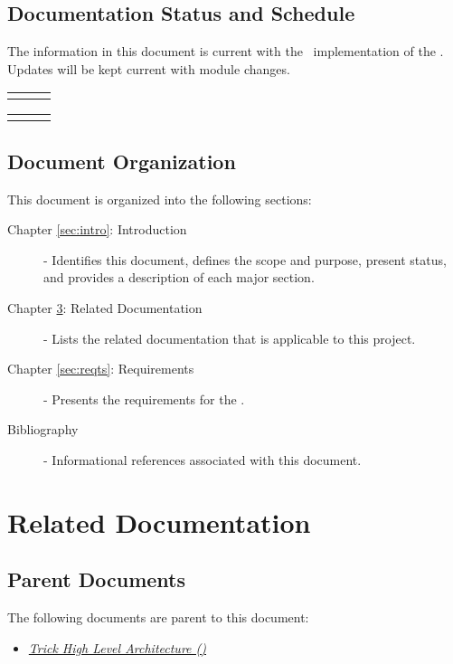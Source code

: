 \documentclass[twoside,11pt,titlepage]{report}
\begin{document}
\section{Documentation Status and Schedule}
The information in this document is current with the \TrickHLAid\
implementation of the \TrickHLA. Updates will be kept current with
module changes.

\begin{tabular}{||l|l|l|} \hline
\documentHistory
\end{tabular}

\begin{tabular}{||l|l|l|} \hline
\DocumentChangeHistory
\end{tabular}

\section{Document Organization}
This document is organized into the following sections:

\begin{description}

\item[Chapter \ref{sec:intro}: Introduction] -
Identifies this document, defines the scope and purpose, present status,
and provides a description of each major section.

\item[Chapter \ref{sec:docs}: Related Documentation] -
Lists the related documentation that is applicable to this project.

\item[Chapter \ref{sec:reqts}: Requirements] -
Presents the requirements for the \TrickHLA.

\item[Bibliography] -
Informational references associated with this document.

\end{description}

\chapter{Related Documentation}\label{sec:docs}

\section{Parent Documents}
The following documents are parent to this document:

\begin{itemize}
\item{\href{file:TrickHLA.pdf}
           {\em Trick High Level Architecture (\TrickHLA)}}
\cite{trickhlaenv:TrickHLA}
\end{itemize}
\end{document}
